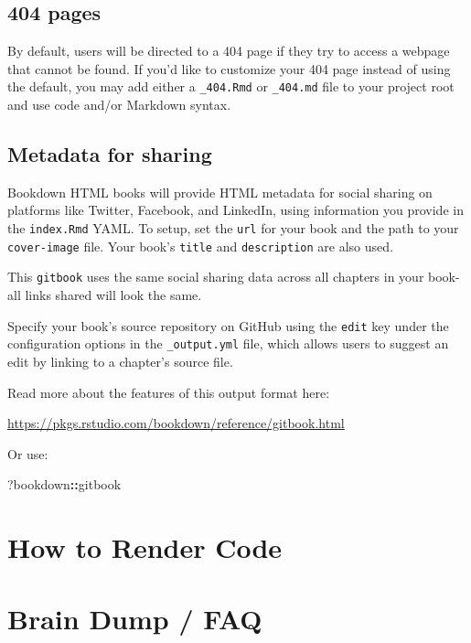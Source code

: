 \documentclass[
]{book}
\newenvironment{Shaded}{\begin{snugshade}}{\end{snugshade}}
\newcommand{\NormalTok}[1]{#1}
\newcommand{\SpecialCharTok}[1]{\textcolor[rgb]{0.81,0.36,0.00}{\textbf{#1}}}
\theoremstyle{definition}
\theoremstyle{definition}
\theoremstyle{definition}
\theoremstyle{definition}
\theoremstyle{remark}
\begin{document}
\section{404 pages}\label{pages}

By default, users will be directed to a 404 page if they try to access a webpage that cannot be found. If you'd like to customize your 404 page instead of using the default, you may add either a \texttt{\_404.Rmd} or \texttt{\_404.md} file to your project root and use code and/or Markdown syntax.

\section{Metadata for sharing}\label{metadata-for-sharing}

Bookdown HTML books will provide HTML metadata for social sharing on platforms like Twitter, Facebook, and LinkedIn, using information you provide in the \texttt{index.Rmd} YAML. To setup, set the \texttt{url} for your book and the path to your \texttt{cover-image} file. Your book's \texttt{title} and \texttt{description} are also used.

This \texttt{gitbook} uses the same social sharing data across all chapters in your book- all links shared will look the same.

Specify your book's source repository on GitHub using the \texttt{edit} key under the configuration options in the \texttt{\_output.yml} file, which allows users to suggest an edit by linking to a chapter's source file.

Read more about the features of this output format here:

\url{https://pkgs.rstudio.com/bookdown/reference/gitbook.html}

Or use:

\begin{Shaded}
\begin{Highlighting}[]
\NormalTok{?bookdown}\SpecialCharTok{::}\NormalTok{gitbook}
\end{Highlighting}
\end{Shaded}

\chapter{How to Render Code}\label{how-to-render-code}

\chapter{Brain Dump / FAQ}\label{brain-dump-faq}
\end{document}

